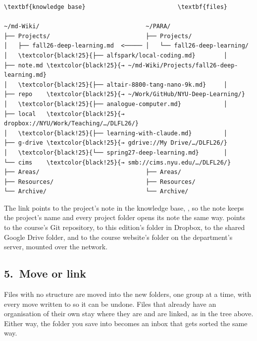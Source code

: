 \documentclass[11pt,a4paper]{article}
\newcommand{\home}{\textasciitilde}
\renewcommand{\slash}{/\allowbreak}  %
\begin{document}
\begin{Verbatim}[fontsize=\fontsize{7}{8.4}, formatcom=\treefont, commandchars=\\\{\}]
\textbf{knowledge base}                          \textbf{files}

~/md-Wiki/                              ~/PARA/
├── Projects/                           ├── Projects/
│   ├── fall26-deep-learning.md  <───── │   └── fall26-deep-learning/
│   \textcolor{black!25}{├── alfspark/local-coding.md}        │       ├── note.md \textcolor{black!25}{→ ~/md-Wiki/Projects/fall26-deep-learning.md}
│   \textcolor{black!25}{├── altair-8800-tang-nano-9k.md}     │       ├── repo    \textcolor{black!25}{→ ~/Work/GitHub/NYU-Deep-Learning/}
│   \textcolor{black!25}{├── analogue-computer.md}            │       ├── local   \textcolor{black!25}{→ dropbox://NYU/Work/Teaching/…/DLFL26/}
│   \textcolor{black!25}{├── learning-with-claude.md}         │       ├── g-drive \textcolor{black!25}{→ gdrive://My Drive/…/DLFL26/}
│   \textcolor{black!25}{└── spring27-deep-learning.md}       │       └── cims    \textcolor{black!25}{→ smb://cims.nyu.edu/…/DLFL26/}
├── Areas/                              ├── Areas/
├── Resources/                          ├── Resources/
└── Archive/                            └── Archive/
\end{Verbatim}

The link  points to the project's note in the knowledge base, , so the note keeps the project's name and every project folder opens its note the same way.  points to the course's Git repository,  to this edition's folder in Dropbox,  to the shared Google Drive folder, and  to the course website's folder on the department's server, mounted over the network.

\subsection*{5.\ Move or link}

Files with no structure are moved into the new folders, one group at a time, with every move written to \name{\home/PARA\slash moves.tsv} so it can be undone. Files that already have an organisation of their own stay where they are and are linked, as in the tree above. Either way, the folder you save into becomes an inbox that gets sorted the same way.
\end{document}
